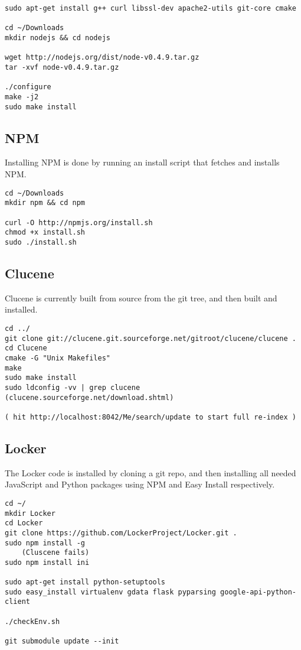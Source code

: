 \documentclass[A4paper,11pt]{article}
\begin{document}
\begin{lstlisting}
sudo apt-get install g++ curl libssl-dev apache2-utils git-core cmake

cd ~/Downloads
mkdir nodejs && cd nodejs

wget http://nodejs.org/dist/node-v0.4.9.tar.gz
tar -xvf node-v0.4.9.tar.gz 

./configure
make -j2
sudo make install
\end{lstlisting}

\newpage
\subsection{NPM}
\label{subsec:NPM}

Installing NPM is done by running an install script that fetches and installs NPM.

\begin{lstlisting}
cd ~/Downloads
mkdir npm && cd npm

curl -O http://npmjs.org/install.sh
chmod +x install.sh
sudo ./install.sh
\end{lstlisting}

\subsection{Clucene}
\label{subsec:Clucene}

Clucene is currently built from source from the git tree, and then built and installed.

\begin{lstlisting}
cd ../
git clone git://clucene.git.sourceforge.net/gitroot/clucene/clucene .
cd Clucene
cmake -G "Unix Makefiles"
make
sudo make install
sudo ldconfig -vv | grep clucene
(clucene.sourceforge.net/download.shtml)

( hit http://localhost:8042/Me/search/update to start full re-index )

\end{lstlisting}

\subsection{Locker}
\label{subsec:Locker}

The Locker code is installed by cloning a git repo, and then installing all needed JavaScript and Python packages using NPM and Easy Install respectively.

\begin{lstlisting}
cd ~/
mkdir Locker
cd Locker
git clone https://github.com/LockerProject/Locker.git .
sudo npm install -g
    (Cluscene fails)
sudo npm install ini

sudo apt-get install python-setuptools
sudo easy_install virtualenv gdata flask pyparsing google-api-python-client

./checkEnv.sh

git submodule update --init

\end{lstlisting}
\end{document}
